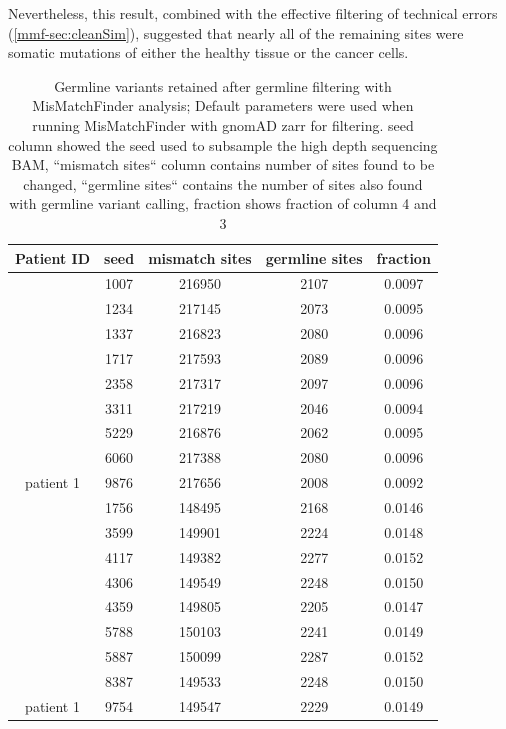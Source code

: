 Nevertheless, this result, combined with the effective filtering of technical errors (\autoref{mmf-sec:cleanSim}), suggested that nearly all of the remaining sites were somatic mutations of either the healthy tissue or the cancer cells.

\begin{table}
\caption[Germline variants retained after germline filtering]{Germline variants retained after germline filtering with MisMatchFinder analysis; Default parameters were used when running MisMatchFinder with gnomAD zarr for filtering. seed column showed the seed used to subsample the high depth sequencing BAM, ``mismatch sites`` column contains number of sites found to be changed, ``germline sites`` contains the number of sites also found with germline variant calling, fraction shows fraction of column 4 and 3}\label{tab:mmf-germlineArtifacts}
\centering
\begin{tabular}{|c|c|c|c|c|}
\toprule
\hline
\textbf{Patient ID} & \textbf{seed} & \textbf{mismatch sites} & \textbf{germline sites} & \textbf{fraction} \\
\hline
 & \num{1007} & \num{216950} &  \num{2107} & \num{0.0097}\\ 
 & \num{1234} & \num{217145} &  \num{2073} & \num{0.0095}\\ 
 & \num{1337} & \num{216823} &  \num{2080} & \num{0.0096}\\ 
 & \num{1717} & \num{217593} &  \num{2089} & \num{0.0096}\\ 
 & \num{2358} & \num{217317} &  \num{2097} & \num{0.0096}\\ 
 & \num{3311} & \num{217219} &  \num{2046} & \num{0.0094}\\ 
 & \num{5229} & \num{216876} &  \num{2062} & \num{0.0095}\\ 
 & \num{6060} & \num{217388} &  \num{2080} & \num{0.0096}\\ 
\multirow{-9}{*}{patient 1} & \num{9876} & \num{217656} &  \num{2008} & \num{0.0092}\\ 
\hline
 & \num{1756} & \num{148495} &  \num{2168} & \num{0.0146}\\ 
 & \num{3599} & \num{149901} &  \num{2224} & \num{0.0148}\\ 
 & \num{4117} & \num{149382} &  \num{2277} & \num{0.0152}\\ 
 & \num{4306} & \num{149549} &  \num{2248} & \num{0.0150}\\ 
 & \num{4359} & \num{149805} &  \num{2205} & \num{0.0147}\\ 
 & \num{5788} & \num{150103} &  \num{2241} & \num{0.0149}\\ 
 & \num{5887} & \num{150099} &  \num{2287} & \num{0.0152}\\ 
 & \num{8387} & \num{149533} &  \num{2248} & \num{0.0150}\\ 
\multirow{-9}{*}{patient 1} & \num{9754} & \num{149547} &  \num{2229} & \num{0.0149}\\
\hline
\bottomrule
\end{tabular}
\end{table}


